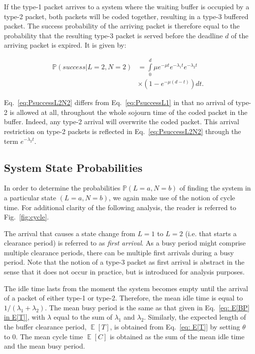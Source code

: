 \documentclass[preprint,12pt]{elsarticle}
\theoremstyle{definition}
\theoremstyle{plain}
\theoremstyle{remark}
\renewcommand{\P}{\ensuremath{\mathbb{P}}}
\newcommand{\e}{e}
\DeclareMathOperator{\E}{\mathbb{E}}
\begin{document}
If the type-1 packet arrives to a system where the waiting buffer is occupied by a type-2 packet, both packets will be coded together, resulting in a type-3 buffered packet. The success probability of the arriving packet is therefore equal to the probability that the resulting type-3 packet is served before the deadline $d$ of the arriving packet is expired. It is given by:

\begin{equation}\label{eq:PsuccessL2N2}
\begin{split}
    \P(success| L = 2, N = 2) &
    = \int\limits_{0}^{d}  \mu\e^{-\mu t} \e^{-\lambda_{1} t} \e^{-\lambda_{2} t}
    \\ &\times (1-\e^{-\mu(d-t)})dt.
    \end{split}
  \end{equation}

Eq.~\eqref{eq:PsuccessL2N2} differs from Eq.~\eqref{eq:PsuccessL1} in that no arrival of type-2 is allowed at all, throughout the whole sojourn time of the coded packet in the buffer. Indeed, any type-2 arrival will overwrite the coded packet. This arrival restriction on type-2 packets is reflected in Eq.~\eqref{eq:PsuccessL2N2} through the term $\e^{-\lambda_{2} t}$.

\subsection*{System State Probabilities}

In order to determine the probabilities $\P(L = a, N = b)$ of finding the system in a particular state $(L = a, N = b)$, we again make use of the notion of cycle time. For additional clarity of the following analysis, the reader is referred to Fig.~\ref{fig:cycle}.

The arrival that causes a state change from $L = 1$ to $L = 2$ (i.e. that starts a clearance period) is referred to as \textit{first arrival}. As a busy period might comprise multiple clearance periods, there can be multiple first arrivals during a busy period. Note that the notion of a type-3 packet as first arrival is abstract in the sense that it does not occur in practice, but is introduced for analysis purposes.

The idle time lasts from the moment the system becomes empty until the arrival of a packet of either type-1 or type-2. Therefore, the mean idle time is equal to $1/(\lambda_{1}+\lambda_{2})$. The mean busy period is the same as that given in Eq.~\eqref{eq: E[BP] in E[T]}, with $\lambda$ equal to the sum of $\lambda_{1}$ and $\lambda_{2}$. Similarly, the expected length of the buffer clearance period, $\E[T]$, is obtained from Eq.~\eqref{eq: E[T]} by setting $\theta$ to 0. The mean cycle time $\E[C]$ is obtained as the sum of the mean idle time and the mean busy period.
\end{document}
